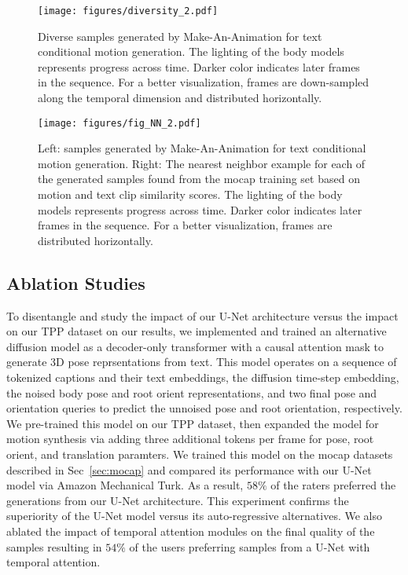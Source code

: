 \documentclass[10pt,twocolumn,letterpaper]{article}
\begin{document}
\begin{figure}
  \centering \texttt{[image: figures/diversity\_2.pdf]}
  \caption{Diverse samples generated by Make-An-Animation for text conditional motion generation. The lighting of the body models represents progress across time. Darker color indicates later frames in the sequence. For a better visualization, frames are down-sampled along the temporal dimension and distributed horizontally. }
  \label{fig:diversity}
\end{figure}


\begin{figure*}
  \centering \texttt{[image: figures/fig\_NN\_2.pdf]}
  \caption{Left: samples generated by Make-An-Animation for text conditional motion generation. Right: The nearest neighbor example for each of the generated samples found from the mocap training set based on motion and text clip similarity scores. The lighting of the body models represents progress across time. Darker color indicates later frames in the sequence. For a better visualization, frames are distributed horizontally. } 
  \label{fig:fig_nn}
\end{figure*}
\subsection{Ablation Studies}
To disentangle and study the impact of our U-Net architecture versus the impact on our TPP dataset on our results, we implemented and trained an alternative diffusion model as a decoder-only transformer with a causal attention mask to generate 3D pose reprsentations from text. This model operates on a sequence of tokenized captions and their text embeddings, the diffusion time-step embedding, the noised body pose and root orient representations, and two final pose and orientation queries to predict
the unnoised pose and root orientation, respectively. We pre-trained this model on our TPP dataset, then expanded the model for motion synthesis via adding three additional tokens per frame for pose, root orient, and translation paramters. We trained this model on the mocap datasets described in Sec~\ref{sec:mocap} and compared its performance with our U-Net model via Amazon Mechanical Turk. As a result, $58\%$ of the raters preferred the generations from our U-Net architecture. This experiment confirms the superiority of the U-Net model versus its auto-regressive alternatives. We also ablated the impact of temporal attention modules on the final quality of the samples resulting in $54\%$ of the users preferring samples from a U-Net with temporal attention. 
\end{document}
